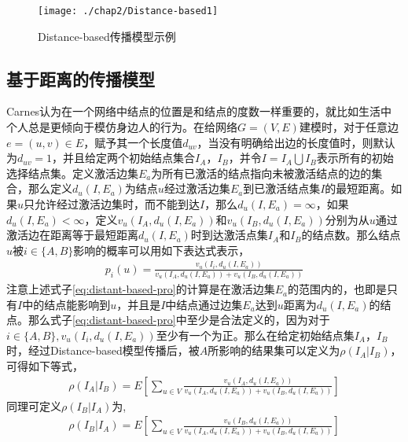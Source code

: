 \begin{figure}[H]
\centering%
	{\texttt{[image: ./chap2/Distance-based1]}}
	\caption{Distance-based传播模型示例}
	\label{fig:Distance-based-inf-diffusion}
\end{figure}


\subsection{基于距离的传播模型}
\label{sec:dist-based-desc}
Carnes认为在一个网络中结点的位置是和结点的度数一样重要的，就比如生活中个人总是更倾向于模仿身边人的行为\cite{carnes2007maximizing}。在给网络$G=(V,E)$建模时，对于任意边$e=(u,v) \in E$，赋予其一个长度值$d_{uv}$，当没有明确给出边的长度值时，则默认为$d_{uv}=1$，并且给定两个初始结点集合$I_{A}$，$I_{B}$，并令$I=I_{A} \bigcup I_{B}$表示所有的初始选择结点集。定义激活边集$E_{a}$为所有已激活的结点指向未被激活结点的边的集合，那么定义$d_{u}(I, E_{a})$为结点$u$经过激活边集$E_{a}$到已激活结点集$I$的最短距离。如果$u$只允许经过激活边集时，而不能到达$I$，那么$d_{u}(I, E_{a})=\infty$，如果$d_{u}(I, E_{a})<\infty$，定义$v_{u}(I_{A}, d_{u}(I, E_{a}))$和$v_{u}(I_{B}, d_{u}(I, E_{a}))$分别为从$u$通过激活边在距离等于最短距离$d_{u}(I, E_{a})$时到达激活点集$I_{A}$和$I_{B}$的结点数。那么结点$u$被$i \in \{A, B\}$影响的概率可以用如下表达式表示，
\begin{equation}
\label{eq:distant-based-pro}
\begin{aligned} 
	p_{i}(u) = \frac{v_{u}(I_{i}, d_{u}(I, E_{a}))}{v_{u}(I_{A}, d_{u}(I, E_{a})) + v_{u}(I_{B}, d_{u}(I, E_{a}))}
\end{aligned}
\end{equation}
注意上述式子\ref{eq:distant-based-pro}的计算是在激活边集$E_{a}$的范围内的，也即是只有$I$中的结点能影响到$u$，并且是$I$中结点通过边集$E_{a}$达到$u$距离为$d_{u}(I, E_{a})$的结点。那么式子\ref{eq:distant-based-pro}中至少是合法定义的，因为对于$i \in \{A, B\}, v_{u}(I_{i}, d_{u}(I, E_{a}))$至少有一个为正。那么在给定初始结点集$I_{A}$，$I_{B}$时，经过Distance-based模型传播后，被$A$所影响的结果集可以定义为$\rho(I_{A}|I_{B})$，可得如下等式，
\begin{equation}
\label{eq:distant-based-resultA}
\begin{aligned} 
	\rho(I_{A}|I_{B}) = E \left[ \sum_{u \in V} \frac{v_{u}(I_{A}, d_{u}(I, E_{a}))}{v_{u}(I_{A}, d_{u}(I, E_{a})) + v_{u}(I_{B}, d_{u}(I, E_{a}))} \right]
\end{aligned}
\end{equation}
同理可定义$\rho(I_{B}|I_{A})$为,
\begin{equation}
\label{eq:distant-based-resultB}
\begin{aligned} 
	\rho(I_{B}|I_{A}) = E \left[ \sum_{u \in V} \frac{v_{u}(I_{B}, d_{u}(I, E_{a}))}{v_{u}(I_{A}, d_{u}(I, E_{a})) + v_{u}(I_{B}, d_{u}(I, E_{a}))} \right]
\end{aligned}
\end{equation}


